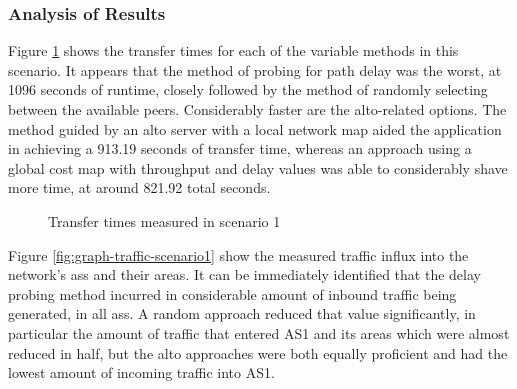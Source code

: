 \subsubsection{Analysis of Results}

    Figure \ref{fig:graph-execution-scenario1} shows the transfer times for each of the variable methods in this scenario.
    It appears that the method of probing for path delay was the worst, at 1096 seconds of runtime, closely followed by the method of randomly selecting between the available peers.
    Considerably faster are the \gls{alto}-related options.
    The method guided by an \gls{alto} server with a local network map aided the application in achieving a 913.19 seconds of transfer time, whereas an approach using a global cost map with throughput and delay values was able to considerably shave more time, at around 821.92 total seconds.

\begin{figure}[H]
\centering
{} %
\caption{Transfer times measured in scenario 1}
\label{fig:graph-execution-scenario1}
\end{figure}

    Figure \ref{fig:graph-traffic-scenario1} show the measured traffic influx into the network's \glspl{as} and their areas.
    It can be immediately identified that the delay probing method incurred in considerable amount of inbound traffic being generated, in all \glspl{as}.
    A random approach reduced that value significantly, in particular the amount of traffic that entered AS1 and its areas which were almost reduced in half, but the \gls{alto} approaches were both equally proficient and had the lowest amount of incoming traffic into AS1.
 
